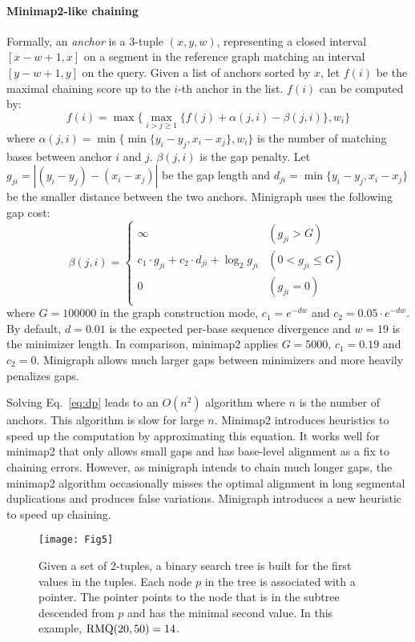 \documentclass[twocolumn]{bmcart}%
\begin{document}
\paragraph*{Minimap2-like chaining}
Formally, an \emph{anchor} is a 3-tuple $(x,y,w)$, representing a closed
interval $[x-w+1,x]$ on a segment in the reference graph matching an interval
$[y-w+1,y]$ on the query. Given a list of anchors sorted by $x$, let $f(i)$ be
the maximal chaining score up to the $i$-th anchor in the list. $f(i)$ can be
computed by:
\begin{equation}\label{eq:dp}
f(i)=\max\big\{\max_{i>j\ge1}\{f(j)+\alpha(j,i)-\beta(j,i)\},w_i\big\}
\end{equation}
where $\alpha(j,i)=\min\big\{\min\{y_i-y_j,x_i-x_j\},w_i\big\}$ is
the number of matching bases between anchor $i$ and $j$.
$\beta(j,i)$ is the gap penalty. Let $g_{ji}=|(y_i-y_j)-(x_i-x_j)|$
be the gap length and $d_{ji}=\min\{y_i-y_j,x_i-x_j\}$ be the smaller distance
between the two anchors.  Minigraph uses the following gap cost:
$$
\beta(j,i)=\left\{\begin{array}{ll}
\infty & (g_{ji}>G) \\
c_1\cdot g_{ji} + c_2\cdot d_{ji} + \log_2{g_{ji}} & (0<g_{ji}\le G) \\
0 & (g_{ji}=0)\\
\end{array}\right.
$$
where $G=100000$ in the graph construction mode, $c_1=e^{-dw}$ and
$c_2=0.05\cdot e^{-dw}$. By default, $d=0.01$ is the expected per-base sequence
divergence and $w=19$ is the minimizer length. In comparison, minimap2 applies
$G=5000$, $c_1=0.19$ and $c_2=0$. Minigraph allows much larger gaps between
minimizers and more heavily penalizes gaps.

Solving Eq.~\ref{eq:dp} leads to an $O(n^2)$ algorithm where $n$ is the number
of anchors. This algorithm is slow for large $n$. Minimap2 introduces
heuristics to speed up the computation by approximating this equation. It works
well for minimap2 that only allows small gaps and has base-level alignment as a
fix to chaining errors. However, as minigraph intends to chain much longer
gaps, the minimap2 algorithm occasionally misses the optimal alignment in long
segmental duplications and produces false variations. Minigraph introduces a
new heuristic to speed up chaining.

\begin{figure}[tb]
\centering
\texttt{[image: Fig5]}
\caption{ Given a
  set of 2-tuples, a binary search tree is built for the first values in the
  tuples. Each node $p$ in the tree is associated with a pointer. The pointer
  points to the node that is in the subtree descended from $p$ and has the
  minimal second value. In this example, ${\rm RMQ}(20,50)=14$.}\label{fig:rmq}
\end{figure}
\end{document}
